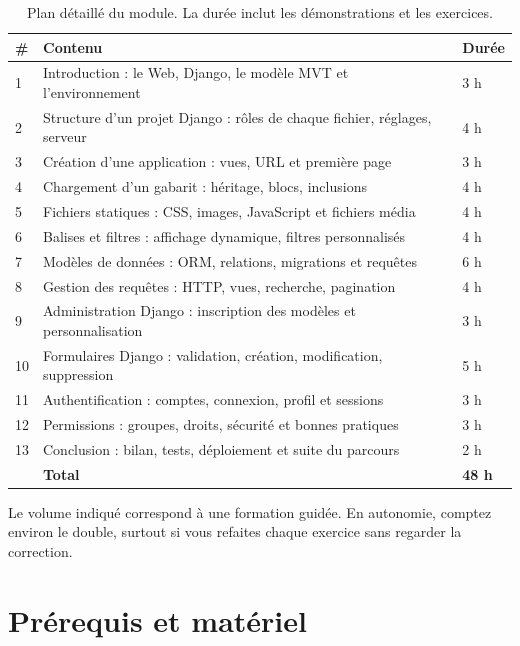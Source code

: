 \begin{table}[htbp]
\centering
\small
\begin{tabularx}{\textwidth}{C{1.3cm} L{8.4cm} C{1.7cm}}
\toprule
\textbf{\#} & \textbf{Contenu} & \textbf{Durée} \\
 & Introduction : le Web, Django, le modèle MVT et l'environnement & 3 h \\
2 & Structure d'un projet Django : rôles de chaque fichier, réglages, serveur & 4 h \\
3 & Création d'une application : vues, URL et première page & 3 h \\
4 & Chargement d'un gabarit : héritage, blocs, inclusions & 4 h \\
5 & Fichiers statiques : CSS, images, JavaScript et fichiers média & 4 h \\
6 & Balises et filtres : affichage dynamique, filtres personnalisés & 4 h \\
7 & Modèles de données : ORM, relations, migrations et requêtes & 6 h \\
8 & Gestion des requêtes : HTTP, vues, recherche, pagination & 4 h \\
9 & Administration Django : inscription des modèles et personnalisation & 3 h \\
10 & Formulaires Django : validation, création, modification, suppression & 5 h \\
11 & Authentification : comptes, connexion, profil et sessions & 3 h \\
12 & Permissions : groupes, droits, sécurité et bonnes pratiques & 3 h \\
13 & Conclusion : bilan, tests, déploiement et suite du parcours & 2 h \\
\midrule
 & \textbf{Total} & \textbf{48 h} \\
\bottomrule
\end{tabularx}
\caption{Plan détaillé du module. La durée inclut les démonstrations et les exercices.}
\end{table}

Le volume indiqué correspond à une formation guidée. En autonomie, comptez environ
le double, surtout si vous refaites chaque exercice sans regarder la correction.

\section*{Prérequis et matériel}

